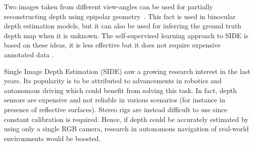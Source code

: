Two images taken from different view-angles can be used for partially reconstructing depth using epipolar geometry~\cite{multiview}.
This fact is used in binocular depth estimation models, but it can also be used for inferring the ground truth depth map when it is unknown.
The self-supervised learning approach to SIDE is based on these ideas, it is less effective but it does not require expensive annotated data \cite{monocular_SSL}.
%
%
%

Single Image Depth Estimation (SIDE) saw a growing research interest in the last years.
Its popularity is to be attributed to advancements in robotics and autonomous driving which could benefit from solving this task.
In fact, depth sensors are expensive and not reliable in various scenarios (for instance in presence of reflective surfaces).
Stereo rigs are instead difficult to use since constant calibration is required.
Hence, if depth could be accurately estimated by using only a single RGB camera, research in autonomous navigation of real-world environments would be boosted.

